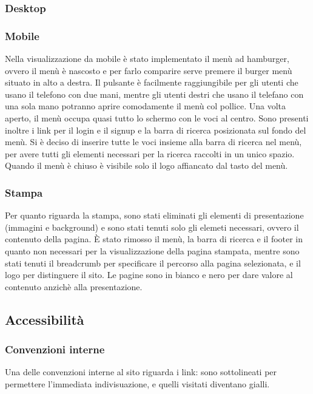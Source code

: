 \subsubsection{Desktop}
\label{ssub:desktop}

\subsubsection{Mobile}
\label{ssub:mobile}
Nella visualizzazione da mobile è stato implementato il menù ad hamburger, ovvero il menù è nascosto e per farlo comparire serve premere il burger menù situato in alto a destra. Il pulsante è facilmente raggiungibile per gli utenti che usano il telefono con due mani, mentre gli utenti destri che usano il telefano con una sola mano potranno aprire comodamente il menù col pollice.
Una volta aperto, il menù occupa quasi tutto lo schermo con le voci al centro. Sono presenti inoltre i link per il login e il signup e la barra di ricerca posizionata sul fondo del menù. Si è deciso di inserire tutte le voci insieme alla barra di ricerca nel menù, per avere tutti gli elementi necessari per la ricerca raccolti in un unico spazio. Quando il menù è chiuso è visibile solo il logo affiancato dal tasto del menù.


\subsubsection{Stampa}
\label{ssub:stampa}
Per quanto riguarda la stampa, sono stati eliminati gli elementi di presentazione (immagini e background) e sono stati tenuti solo gli elemeti necessari, ovvero il contenuto della pagina. È stato rimosso il menù, la barra di ricerca e il footer in quanto non necessari per la visualizzazione della pagina stampata, mentre sono stati tenuti il breadcrumb per specificare il percorso alla pagina selezionata, e il logo per distinguere il sito.
Le pagine sono in bianco e nero per dare valore al contenuto anzichè alla presentazione.

\subsection{Accessibilità}
\label{sub:accessibilità}
\subsubsection{Convenzioni interne}
\label{ssub:convenzioni_interne}
Una delle convenzioni interne al sito riguarda i link: sono sottolineati per permettere l'immediata indivisuazione, e quelli visitati diventano gialli.

